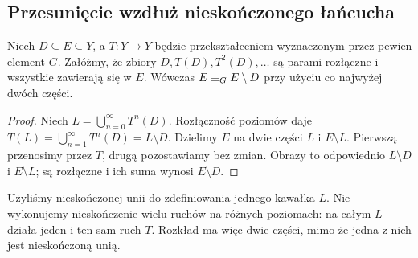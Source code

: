 \subsection{Przesunięcie wzdłuż nieskończonego łańcucha}
\begin{lemat}\label{lem:lancuch}
Niech $D\subseteq E\subseteq Y$, a $T:Y\to Y$ będzie przekształceniem wyznaczonym przez pewien element $G$. Załóżmy, że zbiory $D,T(D),T^2(D),\ldots$ są parami rozłączne i wszystkie zawierają się w $E$. Wówczas $E\mathrel{\equiv_G} E\setminus D$ przy użyciu co najwyżej dwóch części.
\end{lemat}
\begin{proof}
Niech $L=\bigcup_{n=0}^{\infty}T^n(D)$. Rozłączność poziomów daje $T(L)=\bigcup_{n=1}^{\infty}T^n(D)=L\setminus D$. Dzielimy $E$ na dwie części $L$ i $E\setminus L$. Pierwszą przenosimy przez $T$, drugą pozostawiamy bez zmian. Obrazy to odpowiednio $L\setminus D$ i $E\setminus L$; są rozłączne i ich suma wynosi $E\setminus D$.
\end{proof}
\begin{uwaga}
Użyliśmy nieskończonej unii do zdefiniowania jednego kawałka $L$. Nie wykonujemy nieskończenie wielu ruchów na różnych poziomach: na całym $L$ działa jeden i ten sam ruch $T$. Rozkład ma więc dwie części, mimo że jedna z nich jest nieskończoną unią.
\end{uwaga}

